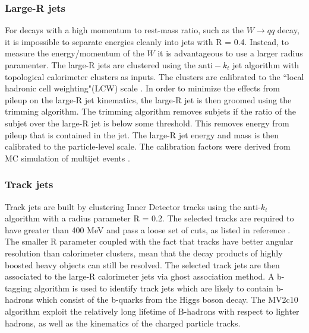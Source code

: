 \subsubsection{Large-R jets}
For decays with a high momentum to rest-mass ratio, such as the $W\rightarrow qq$ decay, it is impossible to separate energies cleanly into jets with R = 0.4. Instead, to measure the energy/momentum of the $W$ it is advantageous to use a larger radius paramenter. The large-R jets are clustered using the ${\mathrm{anti-}k_{t}}$ jet algorithm \cite{antikt_algorithm} with topological calorimeter clusters as inputs. The clusters are calibrated to the ``local hadronic cell weighting"(LCW) scale \cite{ATLAS-TopoClustering}.
In order to minimize the effects from pileup on the large-R jet kinematics, the large-R jet is then groomed
using the trimming algorithm. The trimming algorithm removes subjets if the ratio of the subjet \pt over the large-R jet \pt is below some threshold\cite{Krohn:2009th}. This removes energy from pileup that is contained in the jet. The large-R jet energy and mass is then calibrated to the particle-level
scale. The calibration factors were derived from MC simulation of multijet events \cite{ATLAS-CONF-2016-035}.\newline
\subsubsection{Track jets}
Track jets are built by clustering Inner Detector tracks using the ${\text{anti-}k_{t}}$ algorithm with a radius parameter R = 0.2. The selected tracks are required to have \pt greater than 400 MeV and pass a loose set of cuts, as listed in reference \cite{ATL-PHYS-PUB-2015-035}. The smaller R parameter coupled with the fact that tracks have better angular resolution than calorimeter clusters, mean that the decay products of highly boosted heavy objects can still be resolved. The selected track jets are then associated to the large-R calorimeter jets via ghost association \cite{Cacciari:2008gn} method. A b-tagging algorithm is used to identify track jets which are likely to contain b-hadrons which consist of the b-quarks from the Higgs boson decay. The MV2c10 algorithm exploit the relatively long lifetime of B-hadrons with respect to lighter hadrons, as well as the kinematics of the charged particle tracks.
